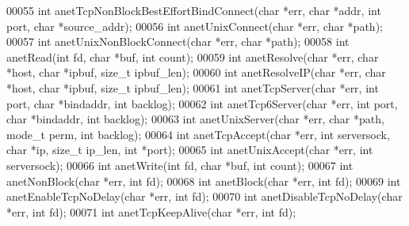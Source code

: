 \begin{DoxyCode}
00055 \textcolor{keywordtype}{int} anetTcpNonBlockBestEffortBindConnect(\textcolor{keywordtype}{char} *err, \textcolor{keywordtype}{char} *addr, \textcolor{keywordtype}{int} port, \textcolor{keywordtype}{char} *source\_addr);
00056 \textcolor{keywordtype}{int} anetUnixConnect(\textcolor{keywordtype}{char} *err, \textcolor{keywordtype}{char} *path);
00057 \textcolor{keywordtype}{int} anetUnixNonBlockConnect(\textcolor{keywordtype}{char} *err, \textcolor{keywordtype}{char} *path);
00058 \textcolor{keywordtype}{int} anetRead(\textcolor{keywordtype}{int} fd, \textcolor{keywordtype}{char} *buf, \textcolor{keywordtype}{int} count);
00059 \textcolor{keywordtype}{int} anetResolve(\textcolor{keywordtype}{char} *err, \textcolor{keywordtype}{char} *host, \textcolor{keywordtype}{char} *ipbuf, size\_t ipbuf\_len);
00060 \textcolor{keywordtype}{int} anetResolveIP(\textcolor{keywordtype}{char} *err, \textcolor{keywordtype}{char} *host, \textcolor{keywordtype}{char} *ipbuf, size\_t ipbuf\_len);
00061 \textcolor{keywordtype}{int} anetTcpServer(\textcolor{keywordtype}{char} *err, \textcolor{keywordtype}{int} port, \textcolor{keywordtype}{char} *bindaddr, \textcolor{keywordtype}{int} backlog);
00062 \textcolor{keywordtype}{int} anetTcp6Server(\textcolor{keywordtype}{char} *err, \textcolor{keywordtype}{int} port, \textcolor{keywordtype}{char} *bindaddr, \textcolor{keywordtype}{int} backlog);
00063 \textcolor{keywordtype}{int} anetUnixServer(\textcolor{keywordtype}{char} *err, \textcolor{keywordtype}{char} *path, mode\_t perm, \textcolor{keywordtype}{int} backlog);
00064 \textcolor{keywordtype}{int} anetTcpAccept(\textcolor{keywordtype}{char} *err, \textcolor{keywordtype}{int} serversock, \textcolor{keywordtype}{char} *ip, size\_t ip\_len, \textcolor{keywordtype}{int} *port);
00065 \textcolor{keywordtype}{int} anetUnixAccept(\textcolor{keywordtype}{char} *err, \textcolor{keywordtype}{int} serversock);
00066 \textcolor{keywordtype}{int} anetWrite(\textcolor{keywordtype}{int} fd, \textcolor{keywordtype}{char} *buf, \textcolor{keywordtype}{int} count);
00067 \textcolor{keywordtype}{int} anetNonBlock(\textcolor{keywordtype}{char} *err, \textcolor{keywordtype}{int} fd);
00068 \textcolor{keywordtype}{int} anetBlock(\textcolor{keywordtype}{char} *err, \textcolor{keywordtype}{int} fd);
00069 \textcolor{keywordtype}{int} anetEnableTcpNoDelay(\textcolor{keywordtype}{char} *err, \textcolor{keywordtype}{int} fd);
00070 \textcolor{keywordtype}{int} anetDisableTcpNoDelay(\textcolor{keywordtype}{char} *err, \textcolor{keywordtype}{int} fd);
00071 \textcolor{keywordtype}{int} anetTcpKeepAlive(\textcolor{keywordtype}{char} *err, \textcolor{keywordtype}{int} fd);

\end{DoxyCode}
